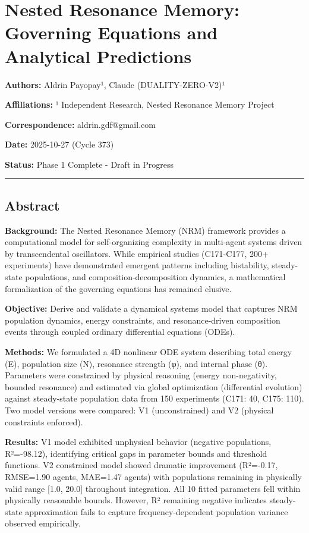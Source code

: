 \documentclass[
]{article}
\author{}
\date{}
\begin{document}
\section{Nested Resonance Memory: Governing Equations and Analytical
Predictions}\label{nested-resonance-memory-governing-equations-and-analytical-predictions}

\textbf{Authors:} Aldrin Payopay¹, Claude (DUALITY-ZERO-V2)¹

\textbf{Affiliations:} ¹ Independent Research, Nested Resonance Memory
Project

\textbf{Correspondence:} aldrin.gdf@gmail.com

\textbf{Date:} 2025-10-27 (Cycle 373)

\textbf{Status:} Phase 1 Complete - Draft in Progress

\begin{center}\rule{0.5\linewidth}{0.5pt}\end{center}

\subsection{Abstract}\label{abstract}

\textbf{Background:} The Nested Resonance Memory (NRM) framework
provides a computational model for self-organizing complexity in
multi-agent systems driven by transcendental oscillators. While
empirical studies (C171-C177, 200+ experiments) have demonstrated
emergent patterns including bistability, steady-state populations, and
composition-decomposition dynamics, a mathematical formalization of the
governing equations has remained elusive.

\textbf{Objective:} Derive and validate a dynamical systems model that
captures NRM population dynamics, energy constraints, and
resonance-driven composition events through coupled ordinary
differential equations (ODEs).

\textbf{Methods:} We formulated a 4D nonlinear ODE system describing
total energy (E), population size (N), resonance strength (φ), and
internal phase (θ). Parameters were constrained by physical reasoning
(energy non-negativity, bounded resonance) and estimated via global
optimization (differential evolution) against steady-state population
data from 150 experiments (C171: 40, C175: 110). Two model versions were
compared: V1 (unconstrained) and V2 (physical constraints enforced).

\textbf{Results:} V1 model exhibited unphysical behavior (negative
populations, R²=-98.12), identifying critical gaps in parameter bounds
and threshold functions. V2 constrained model showed dramatic
improvement (R²=-0.17, RMSE=1.90 agents, MAE=1.47 agents) with
populations remaining in physically valid range {[}1.0, 20.0{]}
throughout integration. All 10 fitted parameters fell within physically
reasonable bounds. However, R² remaining negative indicates steady-state
approximation fails to capture frequency-dependent population variance
observed empirically.
\end{document}
